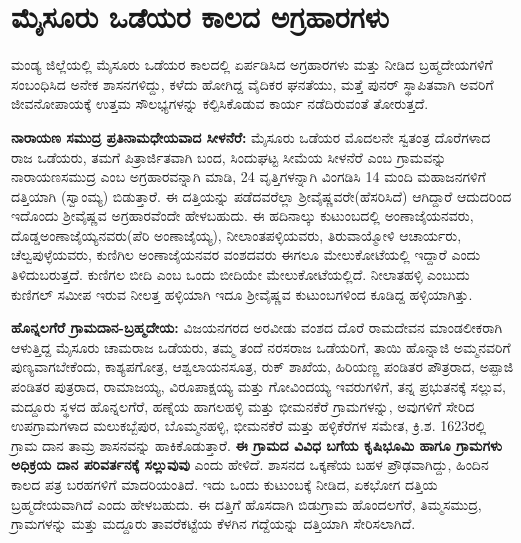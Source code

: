 \section*{ಮೈಸೂರು ಒಡೆಯರ ಕಾಲದ ಅಗ್ರಹಾರಗಳು}

\vskip 2pt

ಮಂಡ್ಯ ಜಿಲ್ಲೆಯಲ್ಲಿ ಮೈಸೂರು ಒಡೆಯರ ಕಾಲದಲ್ಲಿ ಏರ್ಪಡಿಸಿದ ಅಗ್ರಹಾರಗಳು ಮತ್ತು ನೀಡಿದ ಬ್ರಹ್ಮದೇಯಗಳಿಗೆ ಸಂಬಂಧಿಸಿದ ಅನೇಕ ಶಾಸನಗಳಿದ್ದು, ಕಳೆದು ಹೋಗಿದ್ದ ವೈದಿಕರ ಘನತೆಯು, ಮತ್ತೆ ಪುನರ್​ ಸ್ಥಾಪಿತವಾಗಿ ಅವರಿಗೆ ಜೀವನೋಪಾಯಕ್ಕೆ ಉತ್ತಮ ಸೌಲಭ್ಯಗಳನ್ನು ಕಲ್ಪಿಸಿಕೊಡುವ ಕಾರ್ಯ ನಡೆದಿರುವಂತೆ ತೋರುತ್ತದೆ.

\vskip 2pt

\textbf{ನಾರಾಯಣ ಸಮುದ್ರ ಪ್ರತಿನಾಮಧೇಯವಾದ ಸೀಳನೆರೆ:} ಮೈಸೂರು ಒಡೆಯರ ಮೊದಲನೇ ಸ್ವತಂತ್ರ ದೊರೆಗಳಾದ ರಾಜ ಒಡೆಯರು, ತಮಗೆ ಪಿತ್ರಾರ್ಜಿತವಾಗಿ ಬಂದ, ಸಿಂದುಘಟ್ಟ ಸೀಮೆಯ ಸೀಳನೆರೆ ಎಂಬ ಗ್ರಾಮವನ್ನು ನಾರಾಯಣಸಮುದ್ರ ಎಂಬ ಅಗ್ರಹಾರವನ್ನಾಗಿ ಮಾಡಿ, 24 ವೃತ್ತಿಗಳನ್ನಾಗಿ ವಿಂಗಡಿಸಿ 14 ಮಂದಿ ಮಹಾಜನಗಳಿಗೆ ದತ್ತಿಯಾಗಿ (ಸ್ವಾಂಮ್ಯ) ಬಿಡುತ್ತಾರೆ. ಈ ದತ್ತಿಯನ್ನು ಪಡೆದವರೆಲ್ಲಾ ಶ‍್ರೀವೈಷ್ಣವರೇ(ಹೆಸರಿಸಿದೆ) ಆಗಿದ್ದಾರೆ ಆದುದರಿಂದ ಇದೊಂದು ಶ‍್ರೀವೈಷ್ಣವ ಅಗ್ರಹಾರವೆಂದೇ ಹೇಳಬಹುದು. ಈ ಹದಿನಾಲ್ಕು ಕುಟುಂಬದಲ್ಲಿ ಅಂಣಾಜೈಯನವರು, ದೊಡ್ಡಅಂಣಾಜೈಯ್ಯನವರು(ಪೆರಿ ಅಂಣಾಜೈಯ್ಯ), ನೀಲಾಂತಪಳ್ಳಿಯವರು, ತಿರುವಾಯ್ಮೋಳಿ ಆಚಾರ್ಯರು, ಚೆಲ್ವಪುಳ್ಳೆಯವರು, ಕುಣಿಗಿಲ ಅಂಣಾಜೈಯನವರ ವಂಶದವರು ಈಗಲೂ ಮೇಲುಕೋಟೆಯಲ್ಲಿ ಇದ್ದಾರೆ ಎಂದು ತಿಳಿದುಬರುತ್ತದೆ. ಕುಣಿಗಲ ಬೀದಿ ಎಂಬ ಒಂದು ಬೀದಿಯೇ ಮೇಲುಕೋಟೆಯಲ್ಲಿದೆ. ನೀಲಾತಹಳ್ಳಿ ಎಂಬುದು ಕುಣಿಗಲ್​ ಸಮೀಪ ಇರುವ ನೀಲತ್ತ ಹಳ್ಳಿಯಾಗಿ ಇದೂ ಶ‍್ರೀವೈಷ್ಣವ ಕುಟುಂಬಗಳಿಂದ ಕೂಡಿದ್ದ ಹಳ್ಳಿಯಾಗಿತ್ತು.

\vskip 2pt

\textbf{ಹೊನ್ನಲಗೆರೆ ಗ್ರಾಮದಾನ-ಬ್ರಹ್ಮದೇಯ:} ವಿಜಯನಗರದ ಅರವೀಡು ವಂಶದ ದೊರೆ ರಾಮದೇವನ ಮಾಂಡಲೀಕ\-ರಾಗಿ ಆಳುತ್ತಿದ್ದ ಮೈಸೂರು ಚಾಮರಾಜ ಒಡೆಯರು, ತಮ್ಮ ತಂದೆ ನರಸರಾಜ ಒಡೆಯರಿಗೆ, ತಾಯಿ ಹೊನ್ನಾಜಿ ಅಮ್ಮನವರಿಗೆ ಪುಣ್ಯವಾಗಬೇಕೆಂದು, ಕಾಶ್ಯಪಗೋತ್ರ, ಆಶ್ವಲಾಯನಸೂತ್ರ, ರುಕ್​ ಶಾಖೆಯ, ಹಿರಿಯಣ್ಣ ಪಂಡಿತರ ಪೌತ್ರರಾದ, ಅಪ್ಪಾಜಿ ಪಂಡಿತರ ಪುತ್ರರಾದ, ರಾಮಾಜಯ್ಯ, ವಿರೂಪಾಕ್ಷಯ್ಯ ಮತ್ತು ಗೋವಿಂದಯ್ಯ ಇವರುಗಳಿಗೆ, ತನ್ನ ಪ್ರಭುತನಕ್ಕೆ ಸಲ್ಲುವ, ಮದ್ದೂರು ಸ್ಥಳದ ಹೊನ್ನಲಗೆರೆ, ಹಣ್ನೆಯ ಹಾಗಲಹಳ್ಳಿ ಮತ್ತು ಭೀಮನಕೆರೆ ಗ್ರಾಮಗಳನ್ನು, ಅವುಗಳಿಗೆ ಸೇರಿದ ಉಪಗ್ರಾಮ\-ಗಳಾದ ಮಲುಕಬ್ಬೆಪುರ, ಬೊಮ್ಮನಹಳ್ಳಿ, ಭೀಮನಕೆರೆ ಮತ್ತು ಹಳ್ಳಿಕೆರೆಗಳ ಸಮೇತ, ಕ್ರಿ.ಶ. 1623ರಲ್ಲಿ ಗ್ರಾಮ ದಾನ ತಾಮ್ರ ಶಾಸನವನ್ನು ಹಾಕಿಕೊಡುತ್ತಾರೆ. \textbf{ಈ ಗ್ರಾಮದ ವಿವಿಧ ಬಗೆಯ ಕೃಷಿಭೂಮಿ ಹಾಗೂ ಗ್ರಾಮಗಳು ಅಧಿಕ್ರಯ ದಾನ ಪರಿವರ್ತನಕ್ಕೆ ಸಲ್ಲುವುವು} ಎಂದು ಹೇಳಿದೆ. ಶಾಸನದ ಒಕ್ಕಣೆಯ ಬಹಳ ಪ್ರೌಢವಾಗಿದ್ದು, ಹಿಂದಿನ ಕಾಲದ ಪತ್ರ ಬರಹಗಳಿಗೆ ಮಾದರಿಯಂತಿದೆ. ಇದು ಒಂದು ಕುಟುಂಬಕ್ಕೆ ನೀಡಿದ, ಏಕಭೋಗ ದತ್ತಿಯ ಬ್ರಹ್ಮದೇಯವಾಗಿದೆ ಎಂದು ಹೇಳಬಹುದು. ಈ ದತ್ತಿಗೆ ಹೊಸದಾಗಿ ಬಿಡುಗ್ರಾಮ ಹೊಂದಲಗೆರೆ, ತಿಮ್ಮಸಮುದ್ರ, ಗ್ರಾಮಗಳನ್ನು ಮತ್ತು ಮದ್ದೂರು ತಾವರೆಕಟ್ಟೆಯ ಕೆಳಗಿನ ಗದ್ದೆಯನ್ನು ದತ್ತಿಯಾಗಿ ಸೇರಿಸಲಾಗಿದೆ.

